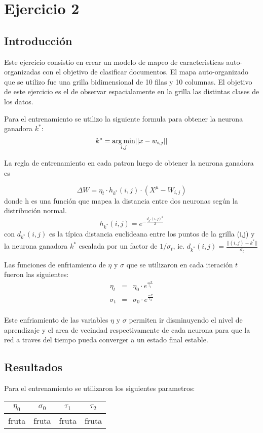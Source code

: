 \section{Ejercicio 2}

\subsection{Introducción}
Este ejercicio consistio en crear un modelo de mapeo de caracteristicas auto-organizadas con el objetivo de clasificar documentos. El mapa
auto-organizado que se utilizo fue una grilla bidimensional de 10 filas y 10 columnas. El objetivo de este ejercicio es el de observar espacialamente
en la grilla las distintas clases de los datos.

Para el entrenamiento se utilizo la siguiente formula para obtener la neurona ganadora $k^*$:
  \[
  k^* = \operatorname*{arg\,min}_{i,j} \lvert\lvert x-w_{i,j} \rvert\rvert
  \]

La regla de entrenamiento en cada patron luego de obtener la neurona ganadora es

\begin{equation}
	\Delta W = \eta_t \cdot h_{k^*}(i,j) \cdot (X^{\mu}-W_{i,j})
\end{equation}
donde h es una función que mapea la distancia entre dos neuronas
según la distribución normal.
\[
	h_{k^*}(i, j) = e^{-\frac{d_{k^*}(i,j)^2}{2}}
\]
con $d_{k^*}(i,j)$ es la típica distancia euclideana entre los puntos de la grilla (i,j) y
la neurona ganadora $k^*$ escalada por un factor de $1/\sigma_t$, ie.
$ d_{k^*}(i,j) = \frac{\lvert \lvert (i,j)-k^* \rvert \rvert}{\sigma_t} $

Las funciones de enfriamiento de $\eta$ y $\sigma$ que se utilizaron 
en cada iteración $t$ fueron las siguientes:
\[
  \begin{array}{ccc}
    \eta_t & = & \eta_0 \cdot e^{\frac{-x}{\tau_1}} \\
    \sigma_t & = & \sigma_0 \cdot e^{\frac{-x}{\tau_2}} \\
  \end{array}
\]

Este enfriamiento de las variables $\eta$ y $\sigma$ permiten ir disminuyendo
el nivel de aprendizaje y el area de vecindad respectivamente de cada neurona
para que la red a traves del tiempo pueda converger a un estado final estable.


\subsection{Resultados}
Para el entrenamiento se utilizaron los siguientes parametros:
\begin{center}
  \begin{tabular}{|c|c|c|c|}
    \hline
    $\eta_0$ & $\sigma_0$ & $\tau_1$ & $\tau_2$ \\
    \hline
    fruta  & fruta & fruta & fruta \\
    \hline
  \end{tabular}
\end{center}

